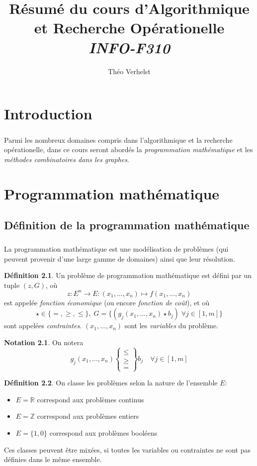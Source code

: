 \documentclass[a4paper]{report}
\author{Théo Verhelst}
\title{Résumé du cours d'Algorithmique et Recherche Opérationelle\\
\emph{INFO-F310}}
\theoremstyle{definition}
\newtheorem*{definition}{Définition}
\newtheorem*{notation}{Notation}
\theoremstyle{remark}
\theoremstyle{plain}
\begin{document}
\maketitle
\tableofcontents

\chapter{Introduction}
\paragraph{}
Parmi les nombreux domaines compris dans l'algorithmique et la recherche
opérationelle, dans ce cours seront abordés la \emph{programmation mathématique}
et les \emph{méthodes combinatoires dans les graphes}.

\chapter{Programmation mathématique}
\section{Définition de la programmation mathématique}
\paragraph{}
La programmation mathématique est une modélisation de problèmes (qui peuvent
provenir d'une large gamme de domaines) ainsi que leur résolution.

\begin{definition}
Un problème de programmation mathématique est défini
par un tuple \((z, G)\), où
\[z:E^n\to E:(x_1,\dots,x_n)\mapsto f(x_1,\dots,x_n)\]
est appelée \emph{fonction économique} (ou encore \emph{fonction de coût}), et
où \[\star\in\{=,\ge,\le\},\;G=\{(g_j(x_1,\dots,x_n)\star b_j)\;\forall
j\in[1,m]\}\] sont appelées \emph{contraintes}.
\((x_1,\dots,x_n)\) sont les \emph{variables} du problème.
\end{definition}

\begin{notation}
On notera
\[g_j(x_1,\dots,x_n)\begin{Bmatrix}\le\\\ge\\=\end{Bmatrix}b_j\quad\forall
j\in[1,m]\]
\end{notation}

\begin{definition}
On classe les problèmes selon la nature de l'ensemble
\(E\):
\begin{itemize}
	\item \(E=\mathbb{R}\) correspond aux problèmes continus
	\item \(E=\mathbb{Z}\) correspond aux problèmes entiers
	\item \(E=\{1,0\}\) correspond aux problèmes booléens
\end{itemize}
Ces classes peuvent être mixées, si toutes les variables ou contraintes ne sont
pas définies dans le même ensemble.
\end{definition}
\end{document}
